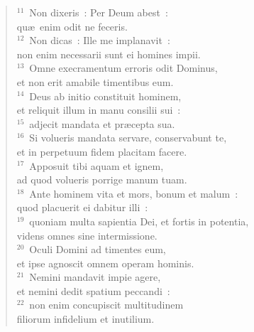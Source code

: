 \begin{flushleft}\begin{verse}${}^{11}$~Non dixeris~: Per Deum abest~:\\ qu\ae\ enim odit ne feceris.\\
${}^{12}$~Non dicas~: Ille me implanavit~:\\ non enim necessarii sunt ei homines impii.\\
${}^{13}$~Omne execramentum erroris odit Dominus,\\ et non erit amabile timentibus eum.\\
${}^{14}$~Deus ab initio constituit hominem,\\ et reliquit illum in manu consilii sui~:\\
${}^{15}$~adjecit mandata et pr\ae cepta sua.\\
${}^{16}$~Si volueris mandata servare, conservabunt te,\\ et in perpetuum fidem placitam facere.\\
${}^{17}$~Apposuit tibi aquam et ignem,\\ ad quod volueris porrige manum tuam.\\
${}^{18}$~Ante hominem vita et mors, bonum et malum~:\\ quod placuerit ei dabitur illi~:\\
${}^{19}$~quoniam multa sapientia Dei, et fortis in potentia,\\ videns omnes sine intermissione.\\
${}^{20}$~Oculi Domini ad timentes eum,\\ et ipse agnoscit omnem operam hominis.\\
${}^{21}$~Nemini mandavit impie agere,\\ et nemini dedit spatium peccandi~:\\
${}^{22}$~non enim concupiscit multitudinem\\ filiorum infidelium et inutilium.\end{verse}\end{flushleft}


